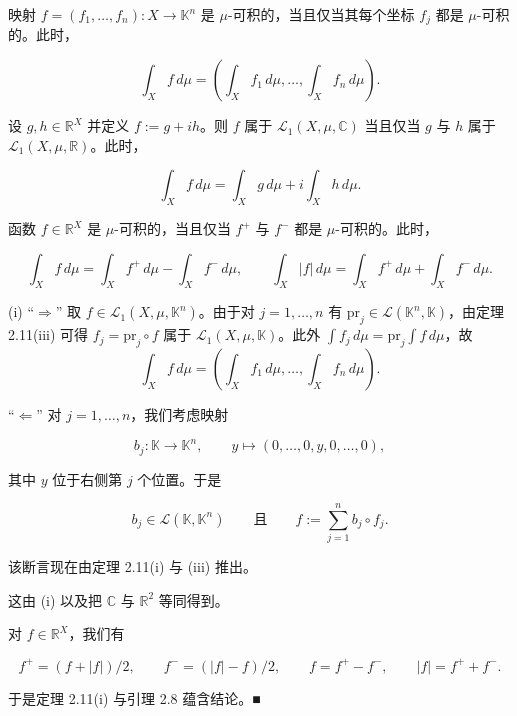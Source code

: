 \begin{corollary}

\begin{subitems}
\item

映射 $ f = (f_1,\ldots,f_n): X \to \mathbb{K}^n $ 是 $ \mu $-可积的，当且仅当其每个坐标 $ f_j $ 都是 $ \mu $-可积的。此时，

\[
\int_X f \, d\mu = \left( \int_X f_1 \, d\mu, \ldots, \int_X f_n \, d\mu \right) .
\]
\item

设 $ g, h \in \mathbb{R}^X $ 并定义 $ f := g + ih $。则 $ f $ 属于 $ \mathcal{L}_1(X,\mu,\mathbb{C}) $ 当且仅当 $ g $ 与 $ h $ 属于 $ \mathcal{L}_1(X,\mu,\mathbb{R}) $。此时，

\[
\int_X f \, d\mu = \int_X g \, d\mu + i \int_X h \, d\mu .
\]
\item

函数 $ f \in \mathbb{R}^X $ 是 $ \mu $-可积的，当且仅当 $ f^+ $ 与 $ f^- $ 都是 $ \mu $-可积的。此时，

\[
\int_X f \, d\mu = \int_X f^+ \, d\mu - \int_X f^- \, d\mu , \qquad \int_X |f| \, d\mu = \int_X f^+ \, d\mu + \int_X f^- \, d\mu .
\]

\proofhead
(i) “$ \Rightarrow $” 取 $ f \in \mathcal{L}_1(X,\mu,\mathbb{K}^n) $。由于对 $ j = 1,\ldots,n $ 有 $ \mathrm{pr}_j \in \mathcal{L}(\mathbb{K}^n,\mathbb{K}) $，由定理 2.11(iii) 可得 $ f_j = \mathrm{pr}_j \circ f $ 属于 $ \mathcal{L}_1(X,\mu,\mathbb{K}) $。此外 $ \int f_j \, d\mu = \mathrm{pr}_j \int f \, d\mu $，故
\[
\int_X f \, d\mu = \left( \int_X f_1 \, d\mu, \ldots, \int_X f_n \, d\mu \right) .
\]

“$ \Leftarrow $” 对 $ j = 1,\ldots,n $，我们考虑映射

\[
b_j: \mathbb{K} \to \mathbb{K}^n , \qquad y \mapsto (0,\ldots,0,y,0,\ldots,0) ,
\]

其中 $ y $ 位于右侧第 $ j $ 个位置。于是

\[
b_j \in \mathcal{L}(\mathbb{K},\mathbb{K}^n) \qquad \text{且} \qquad f := \sum_{j=1}^{n} b_j \circ f_j .
\]

该断言现在由定理 2.11(i) 与 (iii) 推出。

\end{subitems}

\begin{subitems}
\item[（ii）]

这由 (i) 以及把 $ \mathbb{C} $ 与 $ \mathbb{R}^2 $ 等同得到。

\item[（iii）]

对 $ f \in \mathbb{R}^X $，我们有

\[
f^+ = (f + |f|)/2 , \qquad f^- = (|f| - f)/2 , \qquad f = f^+ - f^- , \qquad |f| = f^+ + f^- .
\]

于是定理 2.11(i) 与引理 2.8 蕴含结论。\nobreak\hspace{0.35em}■

\end{subitems}

\end{corollary}

